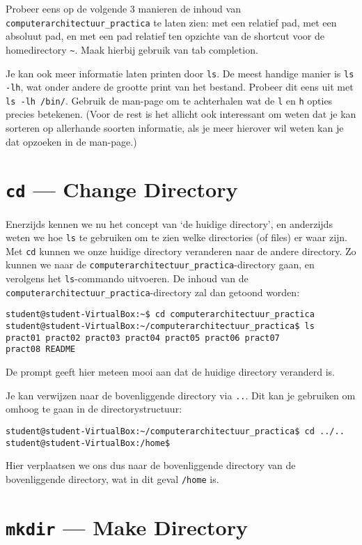 \documentclass[a4paper,twoside,openany]{memoir}
\begin{document}
Probeer eens op de volgende 3 manieren de inhoud van
\verb!computerarchitectuur_practica! te laten zien: met een relatief pad, met
een absoluut pad, en met een pad relatief ten opzichte van de shortcut voor de
homedirectory \verb!~!. Maak hierbij gebruik van tab completion.

Je kan ook meer informatie laten printen door \verb!ls!. De meest handige manier
is \verb!ls -lh!, wat onder andere de grootte print van het bestand. Probeer dit
eens uit met \verb!ls -lh /bin/!. Gebruik de man-page om te achterhalen wat de
\verb!l! en \verb!h! opties precies betekenen. (Voor de rest is het allicht ook
interessant om weten dat je kan sorteren op allerhande soorten informatie, als
je meer hierover wil weten kan je dat opzoeken in de man-page.)

\section{\texttt{cd} --- Change Directory}

Enerzijds kennen we nu het concept van `de huidige directory', en anderzijds
weten we hoe \verb!ls! te gebruiken om te zien welke directories (of files) er
waar zijn. Met \verb!cd! kunnen we onze huidige directory veranderen naar de
andere directory. Zo kunnen we naar de
\verb!computerarchitectuur_practica!-directory gaan, en verolgens het
\verb!ls!-commando uitvoeren. De inhoud van de
\verb!computerarchitectuur_practica!-directory zal dan getoond worden:

\begin{verbatim}
student@student-VirtualBox:~$ cd computerarchitectuur_practica
student@student-VirtualBox:~/computerarchitectuur_practica$ ls
pract01 pract02 pract03 pract04 pract05 pract06 pract07
pract08 README
\end{verbatim}

De prompt geeft hier meteen mooi aan dat de huidige directory veranderd is.

Je kan verwijzen naar de bovenliggende directory via \verb!..!. Dit kan je
gebruiken om omhoog te gaan in de directorystructuur:
\begin{verbatim}
student@student-VirtualBox:~/computerarchitectuur_practica$ cd ../..
student@student-VirtualBox:/home$ 
\end{verbatim}

Hier verplaatsen we ons dus naar de bovenliggende directory van de bovenliggende
directory, wat in dit geval \verb!/home! is.

\section{\texttt{mkdir} --- Make Directory}
\end{document}
